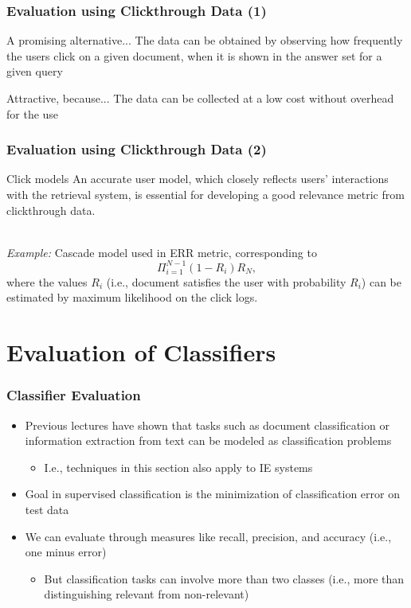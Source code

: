 \documentclass[svgnames]{beamer}
\begin{document}
\begin{frame} \frametitle{Evaluation using Clickthrough Data (1)}
\begin{block}{A promising alternative...}
The data can be obtained by observing how frequently the users click on a given document, when it is shown in the answer set for a given query
\end{block}

\begin{block}{Attractive, because...}
The data can be collected at a low cost without overhead for the use
\end{block}
\end{frame}

\begin{frame} \frametitle{Evaluation using Clickthrough Data (2)}
\begin{block}{Click models}
An accurate user model, which closely reflects users’ interactions with the retrieval system, is essential for developing a good relevance metric from clickthrough data.

~\\
\emph{Example:} Cascade model used in ERR metric, corresponding to
\begin{displaymath}
\Pi_{i=1}^{N-1}(1 - R_i) R_N,
\end{displaymath}
where the values $R_i$ (i.e., document satisfies the user with probability $R_i$) can be estimated by maximum likelihood on the click logs.
\end{block}
\end{frame}


\section{Evaluation of Classifiers}

\begin{frame} \frametitle{Classifier Evaluation}
  
  \begin{itemize}
  \item Previous lectures have shown that tasks such as document classification or information extraction from text can be modeled as classification problems
  \begin{itemize}
  \item I.e., techniques in this section also apply to IE systems
  \end{itemize}  

  \item Goal in supervised classification is the minimization of classification error on test data
  
  \item We can evaluate through measures like recall, precision, and accuracy (i.e., one minus error)
  \begin{itemize}
  \item But classification tasks can involve more than two classes (i.e., more than distinguishing relevant from non-relevant)
  \end{itemize}  
  \end{itemize}

 \end{frame}
\end{document}
